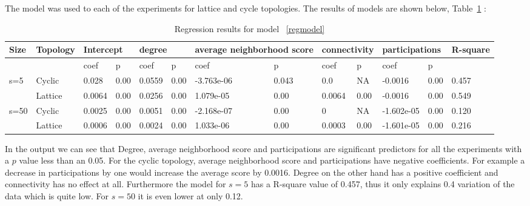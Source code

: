 The model was used to each of the experiments for lattice and cycle topologies.
The results of models are shown below, Table~\ref{regression} :

\begin{table}[!hbtp]
\centering
\begin{adjustbox}{width=1\textwidth}
\small
\begin{tabular}{@{}|l|l|l|l|l|l|l|l|l|l|l|l|l|@{}}
\toprule
Size & Topology & \multicolumn{2}{l|}{Intercept} & \multicolumn{2}{l|}{degree} & \multicolumn{2}{l|}{average neighborhood score} & \multicolumn{2}{l|}{connectivity} & \multicolumn{2}{l|}{participations} & R-square \\ \midrule
     &          & coef            & p            & coef          & p           & coef                      & p                    & coef             & p              & coef                & p             &          \\ \midrule
s=5  & Cyclic    & 0.028           & 0.00         & 0.0559        & 0.00        & -3.763e-06                & 0.043                & 0.0              & NA             & -0.0016             & 0.00          & 0.457    \\ \midrule
     & Lattice  & 0.0064          & 0.00         & 0.0256        & 0.00        & 1.079e-05                 & 0.00                 & 0.0064           & 0.00           & -0.0016             & 0.00          & 0.549    \\ \midrule
s=50 & Cyclic    & 0.0025          & 0.00         & 0.0051        & 0.00        & -2.168e-07                & 0.00                 & 0                & NA             & -1.602e-05          & 0.00          & 0.120    \\ \midrule
     & Lattice  & 0.0006          & 0.00         & 0.0024        & 0.00        & 1.033e-06                 & 0.00                 & 0.0003           & 0.00           & -1.601e-05          & 0.00          & 0.216    \\ \bottomrule
\end{tabular}
\end{adjustbox}
\caption{Regression results for model ~\ref{regmodel}}
\label{regression}
\end{table}

In the output we can see that Degree, average neighborhood score and participations
are significant predictors for all the experiments with a \(p\) value less than
an 0.05.
For the cyclic topology, average neighborhood score and participations have negative
coefficients. For example a decrease in participations by one would increase
the average score by 0.0016. Degree on the other hand has a positive coefficient
and connectivity has no effect at all. Furthermore the model for \(s=5\) has
a R-square value of 0.457, thus it only explains 0.4 variation of the data which is
quite low. For \(s=50\) it is even lower at only 0.12.


